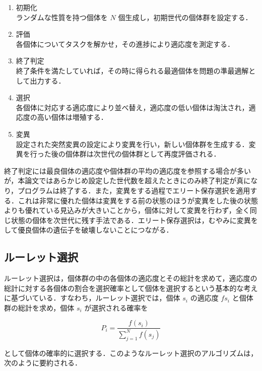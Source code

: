 \begin{enumerate}
    \item 初期化 \\
    ランダムな性質を持つ個体を $ N $ 個生成し，初期世代の個体群を設定する．

    \item 評価 \\
    各個体についてタスクを解かせ，その進捗により適応度を測定する．

    \item 終了判定 \\
    終了条件を満たしていれば，その時に得られる最適個体を問題の準最適解として出力する．

    \item 選択 \\
    各個体に対応する適応度により並べ替え，適応度の低い個体は淘汰され，適応度の高い個体は増殖する．

    \item 変異 \\
    設定された突然変異の設定により変異を行い，新しい個体群を生成する．変異を行った後の個体群は次世代の個体群として再度評価される．
\end{enumerate}

終了判定には最良個体の適応度や個体群の平均の適応度を参照する場合が多いが，本論文ではあらかじめ設定した世代数を超えたときにのみ終了判定が真になり，プログラムは終了する．また，変異をする過程でエリート保存選択を適用する．これは非常に優れた個体は変異をする前の状態のほうが変異をした後の状態よりも優れている見込みが大きいことから，個体に対して変異を行わず，全く同じ状態の個体を次世代に残す手法である．エリート保存選択は，むやみに変異をして優良個体の遺伝子を破壊しないことにつながる．

\subsection{ルーレット選択}
ルーレット選択は，個体群の中の各個体の適応度とその総計を求めて，適応度の総計に対する各個体の割合を選択確率として個体を選択するという基本的な考えに基づいている\cite{遺伝的アルゴリズム}．すなわち，ルーレット選択では，個体 $ s_i $ の適応度 $ f{s_i} $ と個体群の総計を求め，個体 $ s_i $ が選択される確率を

\begin{equation}
    P_i = \frac{f(s_i)}{\sum^N_{j=1} f(s_j)}
\end{equation}

として個体の確率的に選択する．このようなルーレット選択のアルゴリズムは，次のように要約される．

